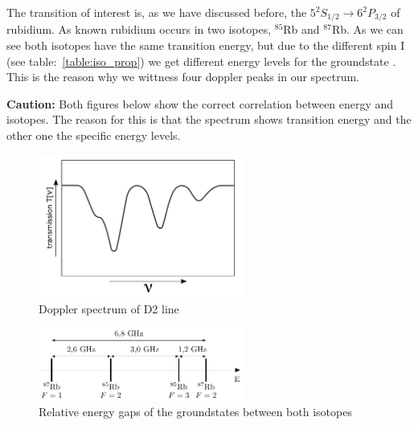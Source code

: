 \vspace{\fill}

The transition of interest is, as we have discussed before, the \(5^{2}S_{1/2} \rightarrow 6^{2}P_{3/2}\) of rubidium. As known rubidium
occurs in two isotopes, \(^{85}\)Rb and \(^{87}\)Rb.
As we can see both isotopes have the same transition energy, but due to the different spin I (see table:~\ref{table:iso_prop}) we get
different energy levels for the groundstate \citep{nist_asd}. This is the reason why we wittness four doppler peaks in our spectrum.
\bigskip

\textbf{Caution:} Both figures below show the correct correlation between energy and isotopes. The reason for this is that the spectrum
shows transition energy and the other one the specific energy levels.

\vspace{\fill}

\begin{figure}[h]
\centering
\includegraphics[width=0.6\textwidth]{spectrum_doppler}
\caption{Doppler spectrum of D2 line}
\label{fig:doppler} 
\end{figure}

\vspace{\fill}

\begin{figure}[h]
\centering
\includegraphics[width=0.6\textwidth]{groundstate}
\caption{Relative energy gaps of the groundstates between both isotopes}
\label{fig:gap} 
\end{figure}